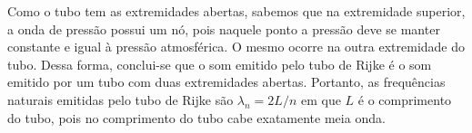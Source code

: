 Como o tubo tem as extremidades abertas, sabemos que na extremidade superior, a onda de pressão possui um nó, pois naquele ponto a pressão deve se manter constante e igual à pressão atmosférica. O mesmo ocorre na outra extremidade do tubo. Dessa forma, conclui-se que o som emitido pelo tubo de Rijke é o som emitido por um tubo com duas extremidades abertas. Portanto, as frequências naturais emitidas pelo tubo de Rijke são \(\lambda_n = 2L/n\) em que \(L\) é o comprimento do tubo, pois no comprimento do tubo cabe exatamente meia onda. 
